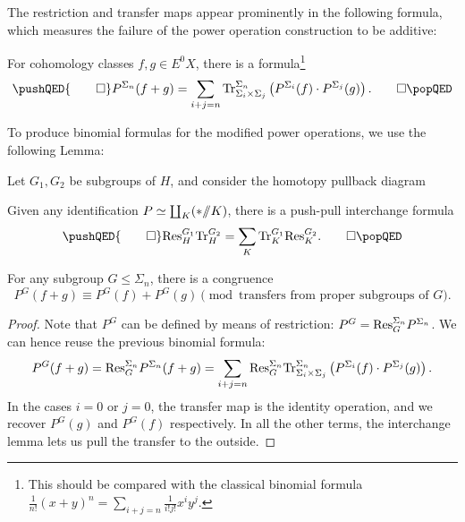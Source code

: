 The restriction and transfer maps appear prominently in the following formula, which measures the failure of the power operation construction to be additive:
\begin{lemma}
For cohomology classes $f, g \in E^0 X$, there is a formula\footnote{This should be compared with the classical binomial formula $\frac{1}{n!} (x + y)^n = \sum_{i+j = n} \frac{1}{i!j!} x^i y^j$.}
\[\pushQED{\qed}
P^{\Sigma_n}(f + g) = \sum_{i + j = n} \Tr_{\Sigma_i \times \Sigma_j}^{\Sigma_n}\left(P^{\Sigma_i}(f) \cdot P^{\Sigma_j}(g)\right). \qedhere
\popQED\]
\end{lemma}

\noindent To produce binomial formulas for the modified power operations, we use the following Lemma:

\begin{lemma}
Let $G_1, G_2$ be subgroups of $H$, and consider the homotopy pullback diagram
\begin{center}
\end{center}
Given any identification $P \simeq \coprod_K (* /\!\!/ K)$, there is a push-pull interchange formula
\[\pushQED{\qed}
\Res^{G_1}_H \Tr_H^{G_2} = \sum_K \Tr^{G_1}_K \Res_K^{G_2}. \qedhere
\popQED\]
\end{lemma}

\begin{corollary}
For any subgroup $G \le \Sigma_n$, there is a congruence \[P^G(f + g) \equiv P^G(f) + P^G(g) \pmod{\text{transfers from proper subgroups of $G$}}.\]
\end{corollary}
\begin{proof}
Note that $P^G$ can be defined by means of restriction: $P^G = \mathrm{Res}^{\Sigma_n}_G P^{\Sigma_n}$.  We can hence reuse the previous binomial formula: \[P^G(f + g) = \mathrm{Res}^{\Sigma_n}_G P^{\Sigma_n}(f + g) = \sum_{i+j = n} \mathrm{Res}^{\Sigma_n}_G \mathrm{Tr}_{\Sigma_i \times \Sigma_j}^{\Sigma_n}\left(P^{\Sigma_i}(f) \cdot P^{\Sigma_j}(g)\right).\]  In the cases $i = 0$ or $j = 0$, the transfer map is the identity operation, and we recover $P^G(g)$ and $P^G(f)$ respectively.  In all the other terms, the interchange lemma lets us pull the transfer to the outside.
\end{proof}

